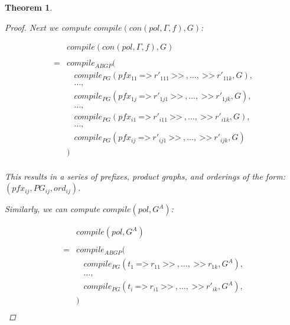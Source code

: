 \documentclass[twocolumn, openany]{sig-alternate-10pt}
\newcommand{\Prefer}{\texttt{>>}}
\newcommand{\Path}{\texttt{=>}}
\newtheorem{thm}{Theorem}
\begin{document}
\begin{thm}
\begin{proof}
    Next we compute $compile(con(pol,\Gamma,f), G)$:

    \[ \begin{array}{ll}
        & compile(con(pol,\Gamma,f), G)  \\
                          & \\
                         =& compile_{ABGP}( \\
                          &  ~~~~ compile_{PG}(pfx_{11} ~\Path~ r'_{111} ~\Prefer~,\dots, ~\Prefer~ r'_{11k},G ), \\
                          &  ~~~~ \dots, \\
                          &  ~~~~ compile_{PG}(pfx_{1j} ~\Path~ r'_{1j1} ~\Prefer~,\dots, ~\Prefer~ r'_{1jk},G ), \\
                          &  ~~~~ \dots, \\
                          &  ~~~~ compile_{PG}(pfx_{i1} ~\Path~ r'_{i11} ~\Prefer~,\dots, ~\Prefer~ r'_{i1k},G ), \\
                          &  ~~~~ \dots, \\
                          &  ~~~~ compile_{PG}(pfx_{ij} ~\Path~ r'_{ij1} ~\Prefer~,\dots, ~\Prefer~ r'_{ijk},G ) \\
                          &  ) \\
    \end{array} \]
 
    \vspace{.5em}
    This results in a series of prefixes, product graphs, and orderings of the form: $(pfx_{ij}, PG_{ij}, ord_{ij})$.

    \vspace{1em}
    Similarly, we can compute $compile(pol, G^A)$:

    \[ \begin{array}{ll}
        & compile(pol,G^A)  \\
                      & \\
                     =& compile_{ABGP}( \\
                      & ~~~~ compile_{PG}(t_1 ~\Path~ r_{11} ~\Prefer~,\dots, ~\Prefer~ r_{1k}, G^A ), \\
                      & ~~~~ \dots, \\
                      & ~~~~ compile_{PG}(t_i ~\Path~ r_{i1} ~\Prefer~,\dots, ~\Prefer~ r'_{ik}, G^A ), \\
                      & ) \\
    \end{array} \]


\end{proof}
\end{thm}
\end{document}
